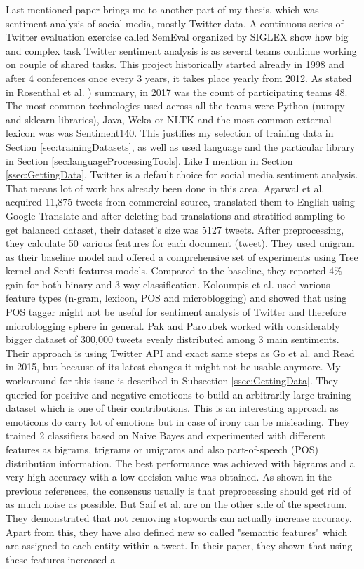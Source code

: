 Last mentioned paper brings me to another part of my thesis, which was sentiment analysis of social media, mostly Twitter data. A continuous series of Twitter evaluation exercise called SemEval organized by SIGLEX show how big and complex task Twitter sentiment analysis is as several teams continue working on couple of shared tasks. This project historically started already in 1998 and after 4 conferences once every 3 years, it takes place yearly from 2012. As stated in Rosenthal et al. \cite{rosenthal2017semeval}) summary, in 2017 was the count of participating teams 48. The most common technologies used across all the teams were Python (numpy and sklearn libraries), Java, Weka or NLTK and the most common external lexicon was was Sentiment140. This justifies my selection of training data in Section \ref{sec:trainingDatasets}, as well as used language and the particular library in Section \ref{sec:languageProcessingTools}. Like I mention in Section \ref{ssec:GettingData}, Twitter is a default choice for social media sentiment analysis. That means lot of work has already been done in this area. Agarwal et al. \cite{agarwal2011sentiment} acquired 11,875 tweets from commercial source, translated them to English using Google Translate and after deleting bad translations and stratified sampling to get balanced dataset, their dataset's size was 5127 tweets. After preprocessing, they calculate 50 various features for each document (tweet). They used unigram as their baseline model and offered a comprehensive set of experiments using Tree kernel and Senti-features models. Compared to the baseline, they reported 4\% gain for both binary and 3-way classification. Koloumpis et al. \cite{kouloumpis2011twitter} used various feature types (n-gram, lexicon, POS and microblogging) and showed that using POS tagger might not be useful for sentiment analysis of Twitter and therefore microblogging sphere in general. Pak and Paroubek \cite{pak2010twitter} worked with considerably bigger dataset of 300,000 tweets evenly distributed among 3 main sentiments. Their approach is using Twitter API and exact same steps as Go et al. \cite{go2009twitter} and Read in 2015, but because of its latest changes it might not be usable anymore. My workaround for this issue is described in Subsection \ref{ssec:GettingData}. They queried for positive and negative emoticons to build an arbitrarily large training dataset which is one of their contributions. This is an interesting approach as emoticons do carry lot of emotions but in case of irony can be misleading. They trained 2 classifiers based on Naive Bayes and experimented with different features as bigrams, trigrams or unigrams and also part-of-speech (POS) distribution information. The best performance was achieved with bigrams and a very high accuracy with a low decision value was obtained. As shown in the previous references, the consensus usually is that preprocessing should get rid of as much noise as possible. But Saif et al. \cite{saif2012semantic} are on the other side of the spectrum. They demonstrated that not removing stopwords can actually increase accuracy. Apart from this, they have also defined new so called "semantic features" which are assigned to each entity within a tweet. In their paper, they shown that using these features increased a 